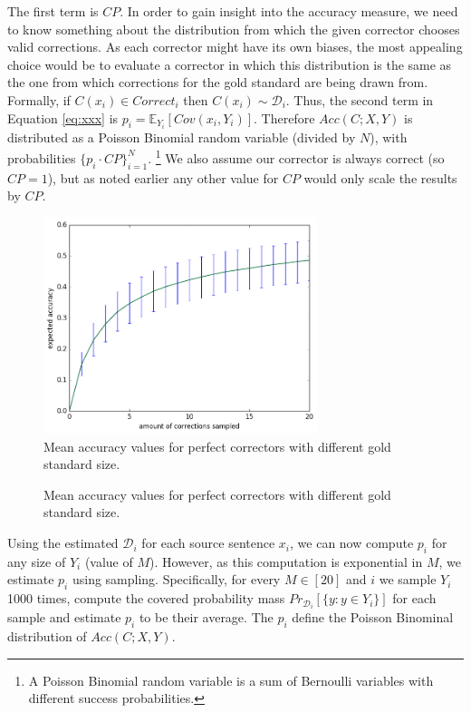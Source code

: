\documentclass[english]{article}
\begin{document}
The first term is $CP$. In order to gain insight into the accuracy measure, we need to know something about the distribution from which the given corrector chooses valid corrections. As each corrector might have its own biases, the most appealing choice would be to evaluate a corrector in which this distribution is the same as the one from which corrections for the gold standard are being drawn from. Formally, if $C(x_i) \in Correct_i$ then $C(x_i) \sim \mathcal{D}_i$. 
Thus, the second
term in Equation \ref{eq:xxx} is $p_i = \mathbb{E}_{Y_i}[Cov(x_i,Y_i)]$. Therefore $Acc(C;X,Y)$ is distributed as
a Poisson Binomial random variable (divided by $N$), with probabilities $\{p_i \cdot CP\}_{i=1}^N$. \footnote{A Poisson Binomial random variable is a sum of Bernoulli variables with different success probabilities.} We also assume our corrector is always correct (so $CP=1$), but as noted earlier any other value for $CP$ would only scale the results by $CP$.

 \begin{figure}
   	\includegraphics[width=8cm]{exact__repeat_1000_accuracy}
 	\caption{Mean accuracy values for perfect correctors with different gold standard size.}
 	\label{fig:accuracy_vals}
 \end{figure}
 \begin{figure}
   \caption{Mean accuracy values for perfect correctors with different gold standard size.}
   \label{fig:accuracy_vals_ind}
 \end{figure}

 Using the estimated $\mathcal{D}_i$ for each source sentence $x_i$, we can now compute $p_i$ for any
 size of $Y_i$ (value of $M$). However, as this computation is exponential in $M$, we estimate $p_i$ using
 sampling. Specifically, for every $M\in[20]$ and $i$ we sample $Y_i$ 1000 times, compute 
 the covered probability mass $Pr_{\mathcal{D}_i}[\{y: y \in Y_i\}]$ for each sample and estimate $p_i$ to be their
 average. The $p_i$ define the Poisson Binominal distribution of $Acc(C;X,Y)$.
\end{document}
